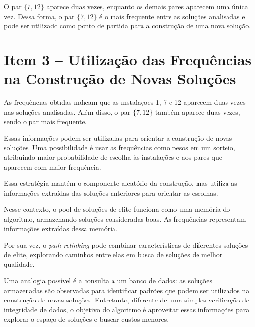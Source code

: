 \documentclass[12pt,a4paper]{article}
\begin{document}
O par $\{7,12\}$ aparece duas vezes, enquanto os demais
pares aparecem uma única vez. Dessa forma, o par
$\{7,12\}$ é o mais frequente entre as soluções
analisadas e pode ser utilizado como ponto de partida
para a construção de uma nova solução.

\section{Item 3 -- Utilização das Frequências na Construção
de Novas Soluções}

As frequências obtidas indicam que as instalações 1,
7 e 12 aparecem duas vezes nas soluções analisadas.
Além disso, o par $\{7,12\}$ também aparece duas vezes,
sendo o par mais frequente.

Essas informações podem ser utilizadas para orientar
a construção de novas soluções. Uma possibilidade é
usar as frequências como pesos em um sorteio,
atribuindo maior probabilidade de escolha às instalações
e aos pares que aparecem com maior frequência.

Essa estratégia mantém o componente aleatório da
construção, mas utiliza as informações extraídas das
soluções anteriores para orientar as escolhas.

Nesse contexto, o pool de soluções de elite funciona
como uma memória do algoritmo, armazenando soluções
consideradas boas. As frequências representam informações
extraídas dessa memória.

Por sua vez, o \textit{path-relinking} pode combinar
características de diferentes soluções de elite,
explorando caminhos entre elas em busca de soluções
de melhor qualidade.

Uma analogia possível é a consulta a um banco de dados:
as soluções armazenadas são observadas para identificar
padrões que podem ser utilizados na
construção de novas soluções. Entretanto, diferente de 
uma simples verificação de integridade de dados,
o objetivo do algoritmo é aproveitar essas informações
para explorar o espaço de soluções e buscar custos
menores.
\end{document}
